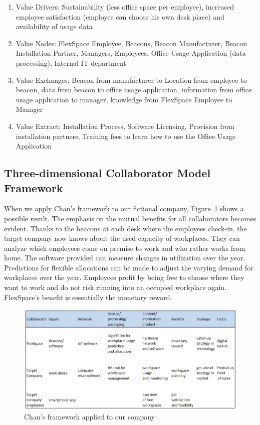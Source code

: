 		\begin{enumerate}
			\item Value Drivers: Sustainability (less office space per employee), increased employee satisfaction (employee can choose his own desk place) and availability of usage data

			\item Value Nodes: FlexSpace Employee, Beacons, Beacon Manufacturer, Beacon Installation Partner, Managers, Employees, Office Usage Application (data processing), Internal IT department

			\item Value Exchanges: Beacon from manufacturer to Location from employee to beacon, data from beacon to office usage application, information from office usage application to manager, knowledge from FlexSpace Employee to Manager

			\item Value Extract: Installation Process, Software Licensing, Provision from installation partners, Training fees to learn how to use the Office Usage Application
		\end{enumerate}

	\subsection{Three-dimensional Collaborator Model Framework}
		When we apply Chan's framework to our fictional company, Figure~\ref{use case chan} shows a possible result. The emphasis on the mutual benefits for all collaborators becomes evident. Thanks to the beacons at each desk where the employees check-in, the target company now knows about the used capacity of workplaces. They can analyze which employees come on premise to work and who rather works from home. The software provided can measure changes in utilization over the year. Predictions for flexible allocations can be made to adjust the varying demand for workplaces over the year. Employees profit by being free to choose where they want to work and do not risk running into an occupied workplace again. FlexSpace's benefit is essentially the monetary reward.

		\begin{figure}[ht]
		    \begin{center}
		    \includegraphics[scale=0.55]{Talk11/chanexampleusecase.jpg}
		    \end{center}
		    \caption{Chan's framework applied to our company}
		    \label{use case chan}
	    \end{figure}

